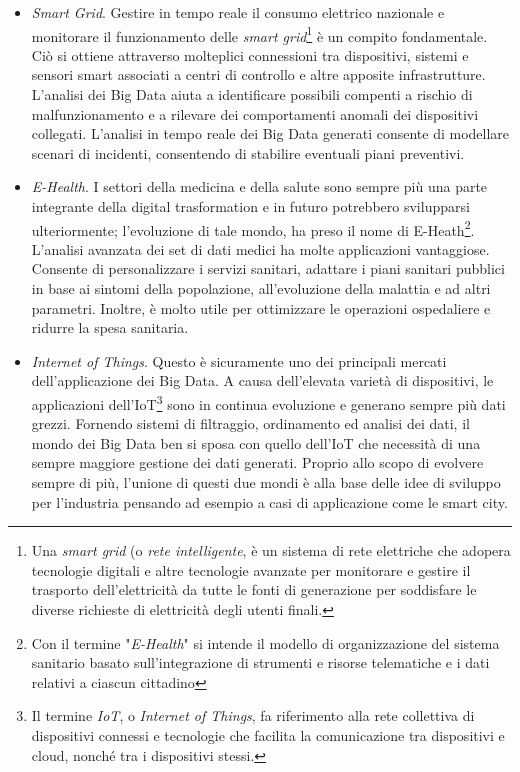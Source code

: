 \begin{itemize}
    \item \textit{Smart Grid}. Gestire in tempo reale il consumo elettrico nazionale e monitorare il funzionamento delle \textit{smart grid}\footnote{Una \textit{smart grid} (o \textit{rete intelligente}, è un sistema di rete elettriche che adopera tecnologie digitali e altre tecnologie avanzate per monitorare e gestire il trasporto dell’elettricità da tutte le fonti di generazione per soddisfare le diverse richieste di elettricità degli utenti finali.\cite{iea_smart_grid}} è un compito fondamentale. Ciò si ottiene attraverso molteplici connessioni tra dispositivi, sistemi e sensori smart associati a centri di controllo e altre apposite infrastrutture. L’analisi dei Big Data aiuta a identificare possibili compenti a rischio di malfunzionamento e a rilevare dei comportamenti anomali dei dispositivi collegati. L’analisi in tempo reale dei Big Data generati consente di modellare scenari di incidenti, consentendo di stabilire eventuali piani preventivi.
    \item \textit{E-Health}. I settori della medicina e della salute sono sempre più una parte integrante della digital trasformation e in futuro potrebbero svilupparsi ulteriormente; l’evoluzione di tale mondo, ha preso il nome di E-Heath\footnote{Con il termine "\textit{E-Health}" si intende il modello di organizzazione del sistema sanitario basato sull’integrazione di strumenti e risorse telematiche e i dati relativi a ciascun cittadino\cite{treccani_ehealth}}. L’analisi avanzata dei set di dati medici ha molte applicazioni vantaggiose. Consente di personalizzare i servizi sanitari, adattare i piani sanitari pubblici in base ai sintomi della popolazione, all’evoluzione della malattia e ad altri parametri. Inoltre, è molto utile per ottimizzare le operazioni ospedaliere e ridurre la spesa sanitaria.
    \item \textit{Internet of Things}. Questo è sicuramente uno dei principali mercati dell’applicazione dei Big Data. A causa dell’elevata varietà di dispositivi, le applicazioni dell’IoT\footnote{Il termine \textit{IoT}, o \textit{Internet of Things}, fa riferimento alla rete collettiva di dispositivi connessi e tecnologie che facilita la comunicazione tra dispositivi e cloud, nonché tra i dispositivi stessi.\cite{aws_iot}} sono in continua evoluzione e generano sempre più dati grezzi. Fornendo sistemi di filtraggio, ordinamento ed analisi dei dati, il mondo dei Big Data ben si sposa con quello dell’IoT che necessità di una sempre maggiore gestione dei dati generati. Proprio allo scopo di evolvere sempre di più, l’unione di questi due mondi è alla base delle idee di sviluppo per l’industria pensando ad esempio a casi di applicazione come le smart city.

\end{itemize}
